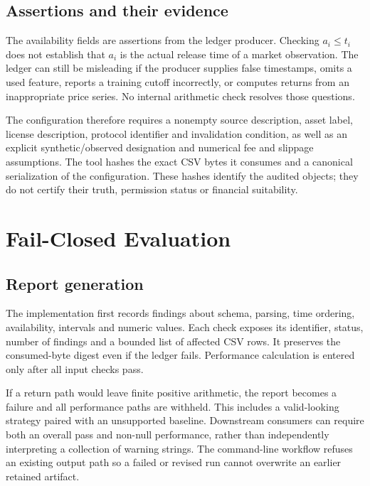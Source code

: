 \documentclass[sigconf,anonymous,nonacm]{acmart}
\begin{document}
\subsection{Assertions and their evidence}
The availability fields are assertions from the ledger producer. Checking $a_i\leq t_i$ does not establish that $a_i$ is the actual release time of a market observation. The ledger can still be misleading if the producer supplies false timestamps, omits a used feature, reports a training cutoff incorrectly, or computes returns from an inappropriate price series. No internal arithmetic check resolves those questions.

The configuration therefore requires a nonempty source description, asset label, license description, protocol identifier and invalidation condition, as well as an explicit synthetic/observed designation and numerical fee and slippage assumptions. The tool hashes the exact CSV bytes it consumes and a canonical serialization of the configuration. These hashes identify the audited objects; they do not certify their truth, permission status or financial suitability.

\section{Fail-Closed Evaluation}
\subsection{Report generation}
The implementation first records findings about schema, parsing, time ordering, availability, intervals and numeric values. Each check exposes its identifier, status, number of findings and a bounded list of affected CSV rows. It preserves the consumed-byte digest even if the ledger fails. Performance calculation is entered only after all input checks pass.

If a return path would leave finite positive arithmetic, the report becomes a failure and all performance paths are withheld. This includes a valid-looking strategy paired with an unsupported baseline. Downstream consumers can require both an overall pass and non-null performance, rather than independently interpreting a collection of warning strings. The command-line workflow refuses an existing output path so a failed or revised run cannot overwrite an earlier retained artifact.
\end{document}
